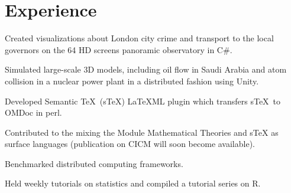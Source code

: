 \documentclass[]{deedy-resume-openfont}
\begin{document}
\hfill
\begin{minipage}[t]{0.66\textwidth} 


\section{Experience}

\vspace{\topsep} %
\begin{tightemize}
\item Created visualizations about London city crime and transport to the local governors on the 64 HD 
screens panoramic observatory in C\#. 
\item Simulated large-scale 3D models, including
oil flow in Saudi Arabia and atom collision in a nuclear power plant in a distributed fashion using Unity. 
\end{tightemize}
\sectionsep

\begin{tightemize}
\item Developed Semantic \TeX \ (sTeX) LaTeXML plugin which transfers 
 s\TeX\ to OMDoc in perl.
 \item Contributed to the mixing the Module Mathematical Theories and sTeX
 as surface languages (publication on CICM will soon become available).
\end{tightemize}

\sectionsep

\begin{tightemize}
\item  Benchmarked distributed computing frameworks.
\item Held weekly tutorials on statistics and compiled a tutorial series on R.
\end{tightemize}
\sectionsep


\end{minipage}
\end{document}

